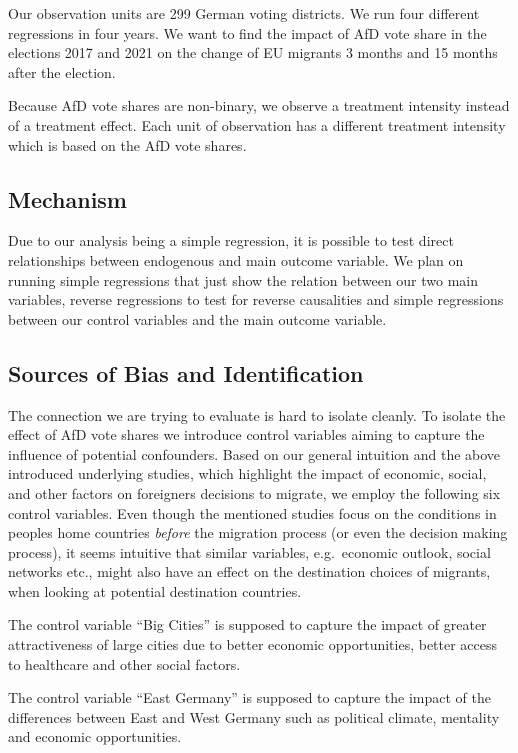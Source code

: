 \documentclass[
  letterpaper,
  DIV=11,
  numbers=noendperiod]{scrartcl}
\begin{document}
Our observation units are 299 German voting districts. We run four
different regressions in four years. We want to find the impact of AfD
vote share in the elections 2017 and 2021 on the change of EU migrants 3
months and 15 months after the election.

Because AfD vote shares are non-binary, we observe a treatment intensity
instead of a treatment effect. Each unit of observation has a different
treatment intensity which is based on the AfD vote shares.

\subsection{Mechanism}\label{mechanism}

Due to our analysis being a simple regression, it is possible to test
direct relationships between endogenous and main outcome variable. We
plan on running simple regressions that just show the relation between
our two main variables, reverse regressions to test for reverse
causalities and simple regressions between our control variables and the
main outcome variable.

\subsection{Sources of Bias and
Identification}\label{sources-of-bias-and-identification}

The connection we are trying to evaluate is hard to isolate cleanly. To
isolate the effect of AfD vote shares we introduce control variables
aiming to capture the influence of potential confounders. Based on our
general intuition and the above introduced underlying studies, which
highlight the impact of economic, social, and other factors on
foreigners decisions to migrate, we employ the following six control
variables. Even though the mentioned studies focus on the conditions in
peoples home countries \emph{before} the migration process (or even the
decision making process), it seems intuitive that similar variables,
e.g.~economic outlook, social networks etc., might also have an effect
on the destination choices of migrants, when looking at potential
destination countries.

The control variable ``Big Cities'' is supposed to capture the impact of
greater attractiveness of large cities due to better economic
opportunities, better access to healthcare and other social factors.

The control variable ``East Germany'' is supposed to capture the impact
of the differences between East and West Germany such as political
climate, mentality and economic opportunities.
\end{document}
